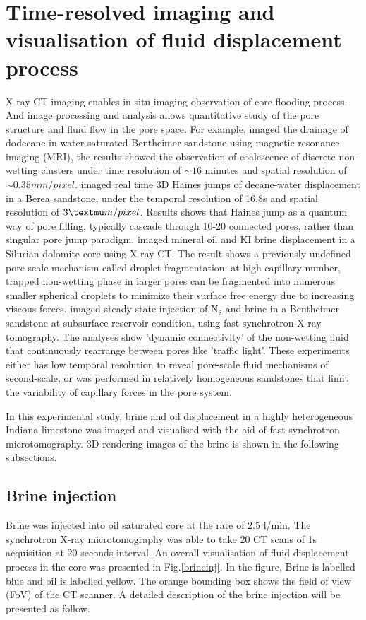 \section{Time-resolved imaging and visualisation of fluid displacement process}
X-ray \textmu CT imaging enables in-situ imaging observation of core-flooding process. And image processing and analysis allows quantitative study of the pore structure and fluid flow in the pore space. For example, \citet{ramskill2016fast} imaged the drainage of dodecane in water-saturated Bentheimer sandstone using magnetic resonance imaging (MRI), the results showed the observation of coalescence of discrete non-wetting clusters under time resolution of $\sim 16$ minutes and spatial resolution of ${\sim 0.35} mm/pixel$. \citet{berg2013real} imaged real time 3D Haines jumps of decane-water displacement in a Berea sandstone, under the temporal resolution of 16.8s and spatial resolution of $3\textmu m/pixel$. Results shows that Haines jump as a quantum way of pore filling, typically cascade through 10-20 connected pores, rather than singular pore jump paradigm. \citet{pak2015droplet} imaged mineral oil and KI brine displacement in a Silurian dolomite core using X-ray \textmu CT. The result shows a previously undefined pore-scale mechanism called droplet fragmentation: at high capillary number, trapped non-wetting phase in larger pores can be fragmented into numerous smaller spherical droplets to minimize their surface free energy due to increasing viscous forces. \citet{reynolds2017dynamic} imaged steady state injection of N$_2$ and brine in a Bentheimer sandstone at subsurface reservoir condition, using fast synchrotron X-ray tomography. The analyses show 'dynamic connectivity' of the non-wetting fluid that continuously rearrange between pores like 'traffic light'. These experiments either has low temporal resolution to reveal pore-scale fluid mechanisms of second-scale, or was performed in relatively homogeneous sandstones that limit the variability of capillary forces in the pore system. 

In this experimental study, brine and oil displacement in a highly heterogeneous Indiana limestone was imaged and visualised with the aid of fast synchrotron microtomography. 3D rendering images of the brine is shown in the following subsections.

\subsection{Brine injection}
Brine was injected into oil saturated core at the rate of 2.5 \textmu l/min. The synchrotron X-ray microtomography was able to take 20 CT scans of 1s acquisition at 20 seconds interval. An overall visualisation of fluid displacement process in the core was presented in Fig.\ref{brineinj}. In the figure, Brine is labelled blue and oil is labelled yellow. The orange bounding box shows the field of view (FoV) of the CT scanner. A detailed description of the brine injection will be presented as follow.

